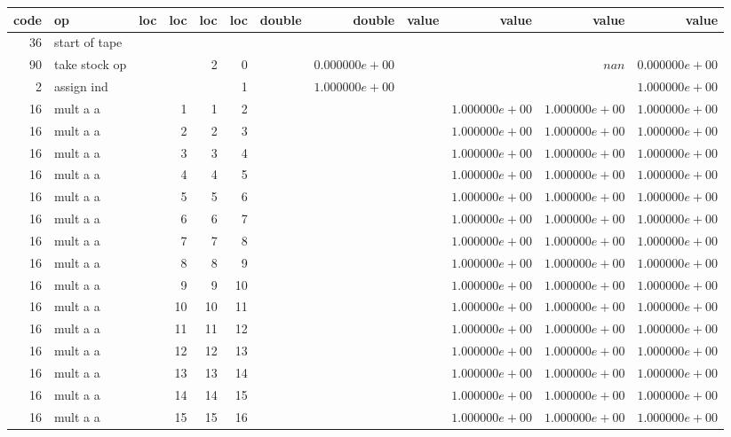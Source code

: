 \documentclass{article}
\begin{document}
\tiny
\begin{tabular}{|r|l|r|r|r|r||r|r||r|r|r|r|} \hline 
 code & op & loc & loc & loc & loc & double & double & value & value & value & value \\ \hline 
 36 & start of tape & & & & & & & & & &  \\ \hline 
90 & take stock op & & & 2 & 0 & &$ 0.000000e+00 $& & &$ nan $&$ 0.000000e+00 $\\ \hline 
2 & assign ind & & & & 1 & &$ 1.000000e+00 $& & & &$ 1.000000e+00 $\\ \hline 
16 & mult a a & & 1 & 1 & 2 & & & &$ 1.000000e+00 $&$ 1.000000e+00 $&$ 1.000000e+00 $\\ \hline 
16 & mult a a & & 2 & 2 & 3 & & & &$ 1.000000e+00 $&$ 1.000000e+00 $&$ 1.000000e+00 $\\ \hline 
16 & mult a a & & 3 & 3 & 4 & & & &$ 1.000000e+00 $&$ 1.000000e+00 $&$ 1.000000e+00 $\\ \hline 
16 & mult a a & & 4 & 4 & 5 & & & &$ 1.000000e+00 $&$ 1.000000e+00 $&$ 1.000000e+00 $\\ \hline 
16 & mult a a & & 5 & 5 & 6 & & & &$ 1.000000e+00 $&$ 1.000000e+00 $&$ 1.000000e+00 $\\ \hline 
16 & mult a a & & 6 & 6 & 7 & & & &$ 1.000000e+00 $&$ 1.000000e+00 $&$ 1.000000e+00 $\\ \hline 
16 & mult a a & & 7 & 7 & 8 & & & &$ 1.000000e+00 $&$ 1.000000e+00 $&$ 1.000000e+00 $\\ \hline 
16 & mult a a & & 8 & 8 & 9 & & & &$ 1.000000e+00 $&$ 1.000000e+00 $&$ 1.000000e+00 $\\ \hline 
16 & mult a a & & 9 & 9 & 10 & & & &$ 1.000000e+00 $&$ 1.000000e+00 $&$ 1.000000e+00 $\\ \hline 
16 & mult a a & & 10 & 10 & 11 & & & &$ 1.000000e+00 $&$ 1.000000e+00 $&$ 1.000000e+00 $\\ \hline 
16 & mult a a & & 11 & 11 & 12 & & & &$ 1.000000e+00 $&$ 1.000000e+00 $&$ 1.000000e+00 $\\ \hline 
16 & mult a a & & 12 & 12 & 13 & & & &$ 1.000000e+00 $&$ 1.000000e+00 $&$ 1.000000e+00 $\\ \hline 
16 & mult a a & & 13 & 13 & 14 & & & &$ 1.000000e+00 $&$ 1.000000e+00 $&$ 1.000000e+00 $\\ \hline 
16 & mult a a & & 14 & 14 & 15 & & & &$ 1.000000e+00 $&$ 1.000000e+00 $&$ 1.000000e+00 $\\ \hline 
16 & mult a a & & 15 & 15 & 16 & & & &$ 1.000000e+00 $&$ 1.000000e+00 $&$ 1.000000e+00 $\\ \hline 

\end{tabular}
\end{document}
